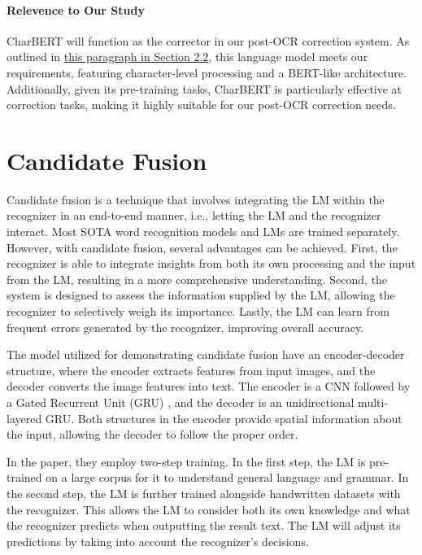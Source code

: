\paragraph*{Relevence to Our Study}
CharBERT will function as the corrector in our post-OCR correction system. As outlined in \hyperlink{model_needs}{this paragraph in Section 2.2}, this language model meets our requirements, featuring character-level processing and a BERT-like architecture. Additionally, given its pre-training tasks, CharBERT is particularly effective at correction tasks, making it highly suitable for our post-OCR correction needs. 

\section{Candidate Fusion}
\label{sec:2_candidate_fusion}
Candidate fusion \citep{kang2021candidate} is a technique that involves integrating the LM within the recognizer in an end-to-end manner, i.e., letting the LM and the recognizer interact. Most SOTA word recognition models and LMs are trained separately. However, with candidate fusion, several advantages can be achieved. First, the recognizer is able to integrate insights from both its own processing and the input from the LM, resulting in a more comprehensive understanding. Second, the system is designed to assess the information supplied by the LM, allowing the recognizer to selectively weigh its importance. Lastly, the LM can learn from frequent errors generated by the recognizer, improving overall accuracy.

The model utilized for demonstrating candidate fusion have an encoder-decoder structure, where the encoder extracts features from input images, and the decoder converts the image features into text. The encoder is a CNN followed by a Gated Recurrent Unit (GRU) \citep{dey2017gate}, and the decoder is an unidirectional multi-layered GRU. Both structures in the encoder provide spatial information about the input, allowing the decoder to follow the proper order.

In the paper, they employ \hypertarget{2_two_step}{two-step training}. In the first step, the LM is pre-trained on a large corpus for it to understand general language and grammar. In the second step, the LM is further trained alongside handwritten datasets with the recognizer. This allows the LM to consider both its own knowledge and what the recognizer predicts when outputting the result text. The LM will adjust its predictions by taking into account the recognizer's decisions.

